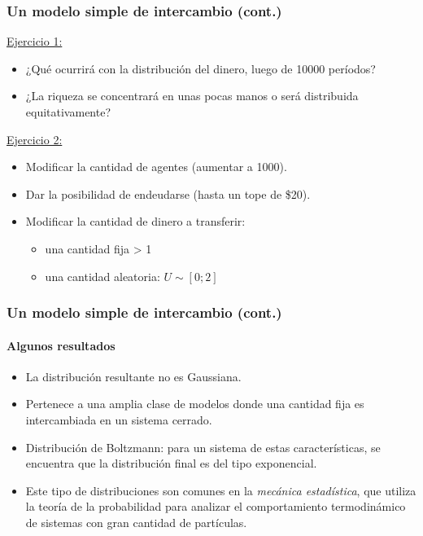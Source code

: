 \documentclass[11pt]{beamer}
\begin{document}
\begin{frame}
\frametitle{Un modelo simple de intercambio (cont.)}
\underline{Ejercicio 1:}
\begin{itemize}
	\item ¿Qué ocurrirá con la distribución del dinero, luego de 10000 períodos? 
	\item ¿La riqueza se concentrará en unas pocas manos o será distribuida equitativamente?
\end{itemize}
\underline{Ejercicio 2:}
\begin{itemize}
	\item Modificar la cantidad de agentes (aumentar a 1000). 
	\item Dar la posibilidad de endeudarse (hasta un tope de \$20).
	\item Modificar la cantidad de dinero a transferir:
	\begin{itemize}
		\item una cantidad fija > 1
		\item una cantidad aleatoria: $U \sim [0; 2]$
	\end{itemize}
\end{itemize}
\end{frame}

\begin{frame}
\frametitle{Un modelo simple de intercambio (cont.)}
\framesubtitle{Algunos resultados}
\begin{itemize}
	\item La distribución resultante no es Gaussiana.
	\item Pertenece a una amplia clase de modelos donde una cantidad fija es intercambiada en un sistema cerrado.
	\item Distribución de Boltzmann: para un sistema de estas características, se encuentra que la distribución final es del tipo exponencial.
	\item Este tipo de distribuciones son comunes en la \textit{mecánica estadística}, que utiliza la teoría de la probabilidad para analizar el comportamiento termodinámico de sistemas con gran cantidad de partículas. 
\end{itemize}
\end{frame}
\end{document}
